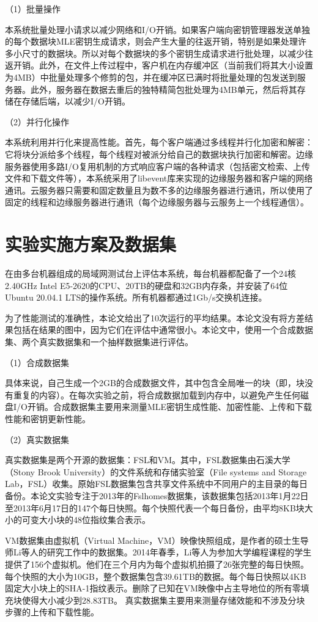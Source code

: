 \documentclass[promaster]{thesis-uestc}
\begin{document}
（1）批量操作

本系统批量处理小请求以减少网络和I/O开销。如果客户端向密钥管理器发送单独的每个数据块MLE密钥生成请求，则会产生大量的往返开销，特别是如果处理许多小尺寸的数据块。所以对每个数据块的多个密钥生成请求进行批处理，以减少往返开销。此外，在文件上传过程中，客户机在内存缓冲区（当前我们将其大小设置为4MB）中批量处理多个修剪的包，并在缓冲区已满时将批量处理的包发送到服务器。此外，服务器在数据去重后的独特精简包批处理为4MB单元，然后将其存储在存储后端，以减少I/O开销。

（2）并行化操作

本系统利用并行化来提高性能。首先，每个客户端通过多线程并行化加密和解密：它将块分派给多个线程，每个线程对被派分给自己的数据块执行加密和解密。边缘服务器使用多路I/O复用机制的方式响应客户端的各种请求（包括密文检索、上传文件和下载文件等），本系统采用了libevent库来实现的边缘服务器和客户端的网络通讯。云服务器只需要和固定数量且为数不多的边缘服务器进行通讯，所以使用了固定的线程和边缘服务器进行通讯（每个边缘服务器与云服务上一个线程通信）。

\section{实验实施方案及数据集}
在由多台机器组成的局域网测试台上评估本系统，每台机器都配备了一个24核2.40GHz Intel E5-2620的CPU、20TB的硬盘和32GB内存条，并安装了64位Ubuntu 20.04.1 LTS的操作系统。所有机器都通过1Gb/s交换机连接。

为了性能测试的准确性，本论文给出了10次运行的平均结果。本论文没有将方差结果包括在结果的图中，因为它们在评估中通常很小。本论文中，使用一个合成数据集、两个真实数据集和一个抽样数据集进行评估。

（1）合成数据集

具体来说，自己生成一个2GB的合成数据文件，其中包含全局唯一的块（即，块没有重复的内容）。在每次实验之前，将合成数据加载到内存中，以避免产生任何磁盘I/O开销。合成数据集主要用来测量MLE密钥生成性能、加密性能、上传和下载性能和密钥更新性能。

（2）真实数据集

真实数据集是两个开源的数据集：FSL和VM。其中，FSL数据集由石溪大学（Stony Brook University）的文件系统和存储实验室（File systems and Storage Lab，FSL）收集。原始FSL数据集包含共享文件系统中不同用户的主目录的每日备份。本论文实验专注于2013年的Fslhomes数据集，该数据集包括2013年1月22日至2013年6月17日的147个每日快照。每个快照代表一个每日备份，由平均8KB块大小的可变大小块的48位指纹集合表示。

VM数据集由虚拟机（Virtual Machine，VM）映像快照组成，是作者的硕士生导师Li等人的研究工作中的数据集。2014年春季，Li等人为参加大学编程课程的学生提供了156个虚拟机。他们在三个月内为每个虚拟机拍摄了26张完整的每日快照。每个快照的大小为10GB，整个数据集包含39.61TB的数据。每个每日快照以4KB固定大小块上的SHA-1指纹表示。删除了已知在VM映像中占主导地位的所有零填充块使得大小减少到28.83TB。
真实数据集主要用来测量存储效能和不涉及分块步骤的上传和下载性能。
\end{document}
